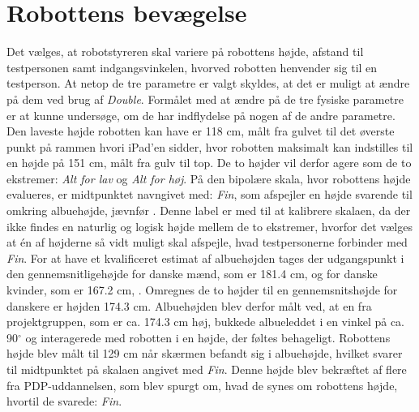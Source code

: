 \section{Robottens bevægelse}
\label{RobottensBevaegelse}
%
Det vælges, at robotstyreren skal variere på robottens højde, afstand til testpersonen samt indgangsvinkelen, hvorved robotten henvender sig til en testperson. At netop de tre parametre er valgt skyldes, at det er muligt at ændre på dem ved brug af \textit{Double}. Formålet med at ændre på de tre fysiske parametre er at kunne undersøge, om de har indflydelse på nogen af de andre parametre.\blankline
%
Den laveste højde robotten kan have er 118 cm, målt fra gulvet til det øverste punkt på rammen hvori iPad'en sidder, hvor robotten maksimalt kan indstilles til en højde på 151 cm, målt fra gulv til top. De to højder vil derfor agere som de to ekstremer: \textit{Alt for lav} og \textit{Alt for høj}. På den bipolære skala, hvor robottens højde evalueres, er midtpunktet navngivet med: \textit{Fin}, som afspejler en højde svarende til omkring albuehøjde, jævnfør . Denne label er med til at kalibrere skalaen, da der ikke findes en naturlig og logisk højde mellem de to ekstremer, hvorfor det vælges at én af højderne så vidt muligt skal afspejle, hvad testpersonerne forbinder med \textit{Fin}. For at have et kvalificeret estimat af albuehøjden tages der udgangspunkt i den gennemsnitligehøjde for danske mænd, som er 181.4 cm, og for danske kvinder, som er 167.2 cm, \parencite{WEB:DanskersHoejde}. Omregnes de to højder til en gennemsnitshøjde for danskere er højden 174.3 cm. Albuehøjden blev derfor målt ved, at en fra projektgruppen, som er ca. 174.3 cm høj, bukkede albueleddet i en vinkel på ca. 90$^\circ$ og interagerede med robotten i en højde, der føltes behageligt. Robottens højde blev målt til 129 cm når skærmen befandt sig i albuehøjde, hvilket svarer til midtpunktet på skalaen angivet med \textit{Fin}. Denne højde blev bekræftet af flere fra PDP-uddannelsen, som blev spurgt om, hvad de synes om robottens højde, hvortil de svarede: \textit{Fin}. 

